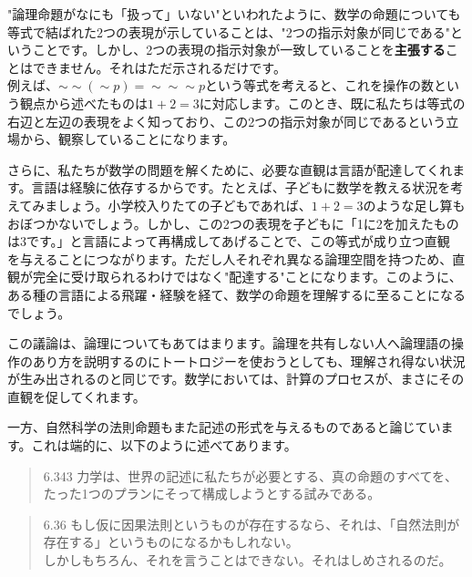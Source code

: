 \documentclass[11pt,a4paper]{jsbook}
\begin{document}
"論理命題がなにも「扱って」いない"といわれたように、数学の命題についても等式で結ばれた2つの表現が示していることは、"2つの指示対象が同じである"ということです。しかし、2つの表現の指示対象が一致していることを\textbf{主張する}ことはできません。それはただ示されるだけです。\\
例えば、$\sim\sim(\sim p)=\sim\sim\sim p$という等式を考えると、これを操作の数という観点から述べたものは$1+2=3$に対応します。このとき、既に私たちは等式の右辺と左辺の表現をよく知っており、この2つの指示対象が同じであるという立場から、観察していることになります。
\par
さらに、私たちが数学の問題を解くために、必要な直観は言語が配達してくれます。言語は経験に依存するからです。たとえば、子どもに数学を教える状況を考えてみましょう。小学校入りたての子どもであれば、$1+2=3$のような足し算もおぼつかないでしょう。しかし、この2つの表現を子どもに「1に2を加えたものは3です。」と言語によって再構成してあげることで、この等式が成り立つ直観
を与えることにつながります。ただし人それぞれ異なる論理空間を持つため、直観が完全に受け取られるわけではなく"配達する"ことになります。このように、ある種の言語による飛躍・経験を経て、数学の命題を理解するに至ることになるでしょう。\par
この議論は、論理についてもあてはまります。論理を共有しない人へ論理語の操作のあり方を説明するのにトートロジーを使おうとしても、理解され得ない状況が生み出されるのと同じです。数学においては、計算のプロセスが、まさにその直観を促してくれます。
\par
一方、自然科学の法則命題もまた記述の形式を与えるものであると論じています。これは端的に、以下のように述べてあります。

\begin{quote}
6.343 力学は、世界の記述に私たちが必要とする、真の命題のすべてを、たった1つのプランにそって構成しようとする試みである。
\end{quote}
\begin{quote}
6.36 もし仮に因果法則というものが存在するなら、それは、「自然法則が存在する」というものになるかもしれない。\\
しかしもちろん、それを言うことはできない。それはしめされるのだ。
\end{quote}
\end{document}
